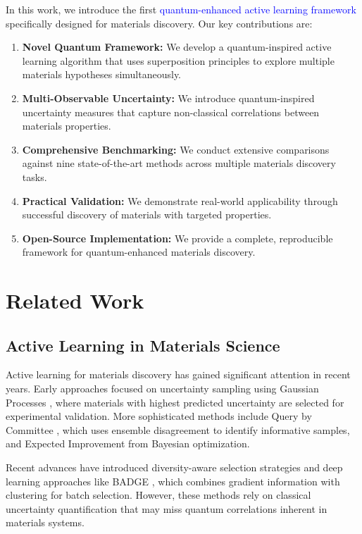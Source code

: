 \documentclass[twocolumn]{article}
\newcommand{\quantum}[1]{\textcolor{blue}{#1}}
\begin{document}
In this work, we introduce the first \quantum{quantum-enhanced active learning framework} specifically designed for materials discovery. Our key contributions are:

\begin{enumerate}
\item \textbf{Novel Quantum Framework:} We develop a quantum-inspired active learning algorithm that uses superposition principles to explore multiple materials hypotheses simultaneously.
\item \textbf{Multi-Observable Uncertainty:} We introduce quantum-inspired uncertainty measures that capture non-classical correlations between materials properties.
\item \textbf{Comprehensive Benchmarking:} We conduct extensive comparisons against nine state-of-the-art methods across multiple materials discovery tasks.
\item \textbf{Practical Validation:} We demonstrate real-world applicability through successful discovery of materials with targeted properties.
\item \textbf{Open-Source Implementation:} We provide a complete, reproducible framework for quantum-enhanced materials discovery.
\end{enumerate}

\section{Related Work}

\subsection{Active Learning in Materials Science}

Active learning for materials discovery has gained significant attention in recent years. Early approaches focused on uncertainty sampling using Gaussian Processes \cite{williams2006gaussian}, where materials with highest predicted uncertainty are selected for experimental validation. More sophisticated methods include Query by Committee \cite{seung1992query}, which uses ensemble disagreement to identify informative samples, and Expected Improvement \cite{jones1998efficient} from Bayesian optimization.

Recent advances have introduced diversity-aware selection strategies and deep learning approaches like BADGE \cite{ash2019deep}, which combines gradient information with clustering for batch selection. However, these methods rely on classical uncertainty quantification that may miss quantum correlations inherent in materials systems.
\end{document}
